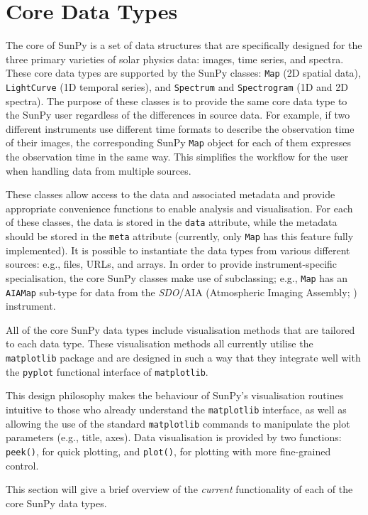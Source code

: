 \section{Core Data Types}\label{sec:DataTypes}

The core of SunPy is a set of data structures that are specifically
designed for the three primary varieties of solar physics data:
images, time series, and spectra. These core data types are supported
by the SunPy classes: \texttt{Map} (2D spatial data),
\texttt{LightCurve} (1D temporal series), and \texttt{Spectrum} and
\texttt{Spectrogram} (1D and 2D spectra).  The purpose of these
classes is to provide the same core data type to the SunPy user
regardless of the differences in source data.  For example, if two
different instruments use different time formats to describe the
observation time of their images, the corresponding SunPy \texttt{Map}
object for each of them expresses the observation time in the same
way.  This simplifies the workflow for the user when handling data
from multiple sources.

These classes allow access to the data
and associated metadata and provide appropriate convenience functions to
enable analysis and visualisation. For each of these classes, the data is
stored in the \texttt{data} attribute, while the metadata should be stored 
in the \texttt{meta} attribute (currently, only \texttt{Map} has this feature 
fully implemented). 
It is possible to instantiate the
data types from various
different sources: e.g., files, URLs, and arrays.  
In order to provide instrument-specific specialisation, the core SunPy classes 
make use of subclassing; e.g., \texttt{Map} has an \texttt{AIAMap} 
sub-type for data from the \textit{SDO}/AIA (Atmospheric Imaging Assembly; \citealt{lemen2012}) instrument. 

All of the core SunPy data types 
include visualisation methods that are tailored to each data type. 
These visualisation methods all currently utilise the \texttt{matplotlib} 
package and are designed in such a way that they integrate well with 
the \texttt{pyplot} functional interface of \texttt{matplotlib}.

This design philosophy makes the behaviour of SunPy's visualisation 
routines intuitive to those who already understand the \texttt{matplotlib}
interface, as well as allowing the use of the standard 
\texttt{matplotlib} commands to manipulate the plot parameters (e.g., title, axes).
Data visualisation is provided by two functions: \texttt{peek()}, for quick 
plotting, and \texttt{plot()}, for plotting with more fine-grained control.

This section will give a brief overview of the \textit{current} functionality 
of each of the core SunPy data types.




